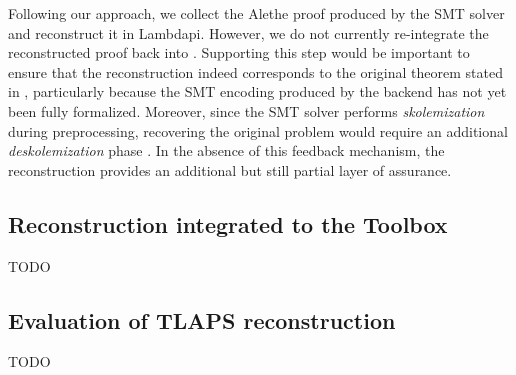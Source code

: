 Following our approach, we collect the Alethe proof produced by the SMT solver and reconstruct it in Lambdapi.
However, we do not currently re-integrate the reconstructed proof back into \tlaplus.
Supporting this step would be important to ensure that the reconstruction indeed corresponds to the original theorem stated in \tlaplus, particularly because the SMT encoding produced by the backend has not yet been fully formalized.
Moreover, since the SMT solver performs \emph{skolemization} during preprocessing, recovering the original problem would require an additional \emph{deskolemization} phase \cite{desko}.
In the absence of this feedback mechanism, the reconstruction provides an additional but still partial layer of assurance.


\subsection{Reconstruction integrated to the Toolbox}
\label{ssec:tlaps-toolbox}

TODO

\subsection{Evaluation of TLAPS reconstruction}
\label{ssec:tlaps-evaluation-results}

TODO